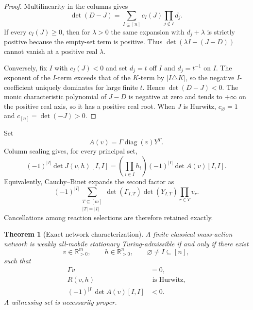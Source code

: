 \documentclass[11pt]{article}
\newtheorem{theorem}{Theorem}[section]
\theoremstyle{definition}
\newcommand{\R}{\mathbb R}
\newcommand{\diag}{\operatorname{diag}}
\begin{document}
\begin{proof}
Multilinearity in the columns gives
\begin{equation}
 \det(D-J)=\sum_{I\subseteq[n]}c_I(J)\prod_{j\notin I}d_j.
 \label{eq:principalexpansion}
\end{equation}
If every $c_I(J)\geq0$, then for $\lambda>0$ the same expansion with
$d_j+\lambda$ is strictly positive because the empty-set term is positive.
Thus $\det(\lambda I-(J-D))$ cannot vanish at a positive real $\lambda$.

Conversely, fix $I$ with $c_I(J)<0$ and set $d_j=t$ off $I$ and $d_j=t^{-1}$
on $I$.  The exponent of the $I$-term exceeds that of the $K$-term by
$|I\triangle K|$, so the negative $I$-coefficient uniquely dominates for
large finite $t$.  Hence $\det(D-J)<0$.  The monic characteristic polynomial
of $J-D$ is negative at zero and tends to $+\infty$ on the positive real
axis, so it has a positive real root.  When $J$ is Hurwitz,
$c_\varnothing=1$ and $c_{[n]}=\det(-J)>0$.
\end{proof}

Set
\[
 A(v)=\Gamma\diag(v)Y^T.
\]
Column scaling gives, for every principal set,
\begin{equation}
 (-1)^{|I|}\det J(v,h)[I,I]
 =\left(\prod_{i\in I}h_i\right)(-1)^{|I|}\det A(v)[I,I].
 \label{eq:minoridentity}
\end{equation}
Equivalently, Cauchy--Binet expands the second factor as
\[
 (-1)^{|I|}
 \sum_{\substack{T\subseteq[m]\\|T|=|I|}}
 \det(\Gamma_{I,T})\det(Y_{I,T})\prod_{r\in T}v_r.
\]
Cancellations among reaction selections are therefore retained exactly.

\begin{theorem}[Exact network characterization]
\label{thm:maincharacterization}
A finite classical mass-action network is weakly all-mobile stationary
Turing-admissible if and only if there exist
\[
 v\in\R_{>0}^m,
 \qquad h\in\R_{>0}^n,
 \qquad \varnothing\ne I\subseteq[n],
\]
such that
\begin{align}
 \Gamma v&=0,\label{eq:flux}\\
 R(v,h)&\text{ is Hurwitz},\label{eq:RH}\\
 (-1)^{|I|}\det A(v)[I,I]&<0.\label{eq:negative}
\end{align}
A witnessing set is necessarily proper.
\end{theorem}
\end{document}
